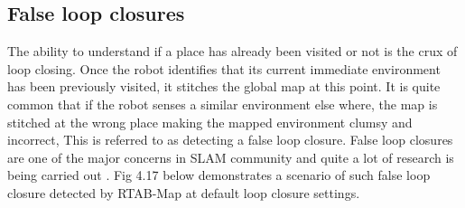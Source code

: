 \subsection{False loop closures}
The ability to understand if a place has already been visited or not is the crux of loop closing. Once the robot identifies that its current immediate environment has been previously visited, it stitches the global map at this point. It is quite common that if the robot senses a similar environment else where, the map is stitched at the wrong place making the mapped environment clumsy and incorrect, This is referred to as detecting a false loop closure. False loop closures are one of the major concerns in SLAM community and quite a lot of research is being carried out \cite{22}\cite{23}. 
Fig 4.17 below demonstrates a scenario of such false loop closure detected by RTAB-Map at default loop closure settings. 

